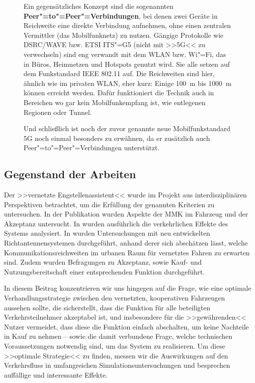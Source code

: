 \begin{figure}[t]
{		Ein gegensätzliches Konzept sind die sogenannten \textbf{\color{colorKAMOLightGreen}Peer"=to"=Peer"=Verbindungen}, bei denen zwei Geräte in Reichweite eine direkte Verbindung aufnehmen, ohne einen zentralen Vermittler (das Mobilfunknetz) zu nutzen. Gängige Protokolle wie DSRC/WAVE bzw. ETSI ITS"=G5 (nicht mit >>5G<< zu verwechseln) sind eng verwandt mit dem WLAN bzw. Wi"=Fi, das in Büros, Heimnetzen und Hotspots genutzt wird. Sie alle setzen auf dem Funkstandard IEEE 802.11 auf. Die Reichweiten sind hier, ähnlich wie im privaten WLAN, eher kurz: Einige 100~m bis 1000~m können erreicht werden. Dafür funktioniert die Technik auch in Bereichen wo gar kein Mobilfunkempfang ist, wie entlegenen Regionen oder Tunnel.
		
		Und schließlich ist noch der zuvor genannte neue Mobilfunkstandard 5G noch einmal besonders zu erwähnen, da er zusätzlich auch Peer"=to"=Peer"=Verbindungen unterstützt.
		}
		\end{figure}

\subsection{Gegenstand der Arbeiten}

Der >>vernetzte Engstellenassistent<< wurde im Projekt aus interdisziplinären Perspektiven betrachtet, um die Erfüllung der genannten Kriterien zu untersuchen. In der Publikation \cite{ehrhardt2021gap} wurden Aspekte der MMK im Fahrzeug und der Akzeptanz untersucht. In \cite{baumannbottleneck} wurden ausführlich die verkehrlichen Effekte des Systems analysiert. In \cite{Kowalewski2020_1000099791} wurden Untersuchungen mit neu entwickelten Richtantennensystemen durchgeführt, anhand derer sich abschätzen lässt, welche Kommunikationsreichweiten im urbanen Raum für vernetztes Fahren zu erwarten sind. Zudem wurden Befragungen zu Akzeptanz, sowie Kauf- und Nutzungsbereitschaft einer entsprechenden Funktion durchgeführt.

In diesem Beitrag konzentrieren wir uns hingegen auf die Frage, wie eine optimale Verhandlungsstrategie zwischen den vernetzten, kooperativen Fahrzeugen aussehen sollte, die sicherstellt, dass die Funktion für alle beteiligten Verkehrsteilnehmer akzeptabel ist, und insbesondere für die >>gewährenden<< Nutzer vermeidet, dass diese die Funktion einfach abschalten, um keine Nachteile in Kauf zu nehmen -- sowie die damit verbundene Frage, welche technischen Voraussetzungen notwendig sind, um das System zu realisieren. Um diese >>optimale Strategie<< zu finden, messen wir die Auswirkungen auf den Verkehrsfluss in umfangreichen Simulationsuntersuchungen und besprechen auffällige und interessante Effekte.

